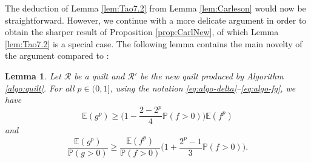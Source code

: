 \documentclass[11pt, reqno]{amsart}
\newtheorem{lemma}[theorem]{Lemma}
\theoremstyle{definition}
\theoremstyle{remark}
\numberwithin{equation}{section}
\newcommand{\E}{\mathbb E}
\renewcommand{\P}{\mathbb P}
\begin{document}
The deduction of Lemma \ref{lem:Tao7.2} from Lemma \ref{lem:Carleson} would now be straightforward. However, we continue with a more delicate argument in order to obtain the sharper result of Proposition \ref{prop:CarlNew}, of which Lemma \ref{lem:Tao7.2} is a special case. The following lemma contains the main novelty of the argument compared to \cite{Car,Tao}:

\begin{lemma}\label{lem:ratio}
Let $\mathscr R$ be a quilt and $\mathscr R'$ be the new quilt produced by Algorithm \ref{algo:quilt}.
For all $p\in(0,1]$, using the notation \eqref{eq:algo-delta}--\eqref{eq:algo-fg}, we have
\begin{equation*}
  \E(g^p)\geq\Big(1-\frac{2-2^p}{4}\P(f>0)\Big)\E(f^p)
\end{equation*}
and
\begin{equation*}
  \frac{\E(g^p)}{\P(g>0)}
  \geq\frac{\E(f^p)}{\P(f>0)}\Big(1+\frac{2^p-1}{3}\P(f>0)\Big).
\end{equation*}
\end{lemma}
\end{document}
